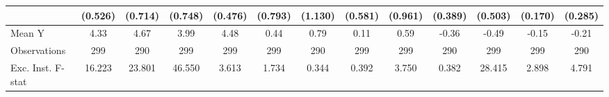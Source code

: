 {\begin{tabular}{l*{12}{c}}
            &     (0.526)         &     (0.714)         &     (0.748)         &     (0.476)         &     (0.793)         &     (1.130)         &     (0.581)         &     (0.961)         &     (0.389)         &     (0.503)         &     (0.170)         &     (0.285)         \\
\midrule
Mean Y      &        4.33         &        4.67         &        3.99         &        4.48         &        0.44         &        0.79         &        0.11         &        0.59         &       -0.36         &       -0.49         &       -0.15         &       -0.21         \\
Observations&         299         &         290         &         299         &         299         &         299         &         290         &         299         &         299         &         290         &         299         &         299         &         290         \\
Exc. Inst. F-stat&      16.223         &      23.801         &      46.550         &       3.613         &       1.734         &       0.344         &       0.392         &       3.750         &       0.382         &      28.415         &       2.898         &       4.791         \\
\bottomrule
\end{tabular}
}
